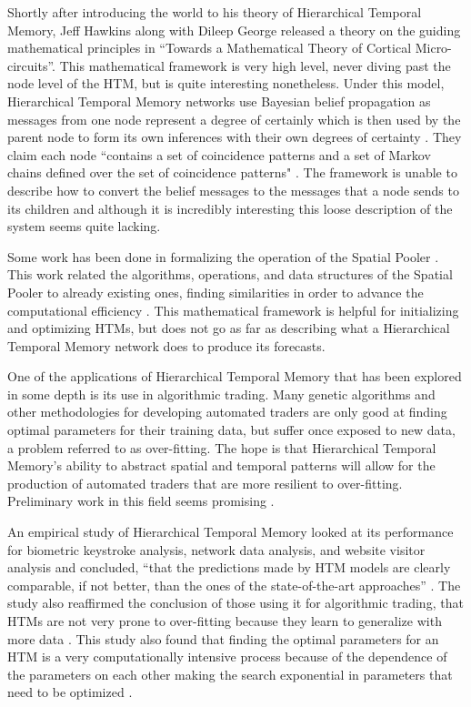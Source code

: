 \documentclass[fleqn,notitlepage,minimal]{article}
\begin{document}
	Shortly after introducing the world to his theory of Hierarchical Temporal Memory, Jeff Hawkins along with Dileep George released a theory on the guiding mathematical principles in ``Towards a Mathematical Theory of Cortical Micro-circuits''. This mathematical framework is very high level, never diving past the node level of the HTM, but is quite interesting nonetheless. Under this model, Hierarchical Temporal Memory networks use Bayesian belief propagation as messages from one node represent a degree of certainly which is then used by the parent node to form its own inferences with their own degrees of certainty \cite{Towards}. They claim each node ``contains a set of coincidence patterns and a set of Markov chains defined over the set of coincidence patterns" \cite{Towards}. The framework is unable to describe how to convert the belief messages to the messages that a node sends to its children and although it is incredibly interesting this loose description of the system seems quite lacking.
	
	Some work has been done in formalizing the operation of the Spatial Pooler \cite{Framework}. This work related the algorithms, operations, and data structures of the Spatial Pooler to already existing ones, finding similarities in order to advance the computational efficiency \cite{Framework}. This mathematical framework is helpful for initializing and optimizing HTMs, but does not go as far as describing what a Hierarchical Temporal Memory network does to produce its forecasts.
	
	One of the applications of Hierarchical Temporal Memory that has been explored in some depth is its use in algorithmic trading. Many genetic algorithms and other methodologies for developing automated traders are only good at finding optimal parameters for their training data, but suffer once exposed to new data, a problem referred to as over-fitting. The hope is that Hierarchical Temporal Memory's ability to abstract spatial and temporal patterns will allow for the production of automated traders that are more resilient to over-fitting. Preliminary work in this field seems promising \cite{Evaluation}.
	
	An empirical study of Hierarchical Temporal Memory looked at its performance for biometric keystroke analysis, network data analysis, and website visitor analysis and concluded, ``that the predictions made by HTM models are clearly comparable, if not better, than the ones of the state-of-the-art approaches'' \cite{Galetzka}. The study also reaffirmed the conclusion of those using it for algorithmic trading, that HTMs are not very prone to over-fitting because they learn to generalize with more data \cite{Evaluation} \cite{Galetzka}. This study also found that finding the optimal parameters for an HTM is a very computationally intensive process because of the dependence of the parameters on each other making the search exponential in parameters that need to be optimized \cite{Galetzka}.
	 
\end{document}
